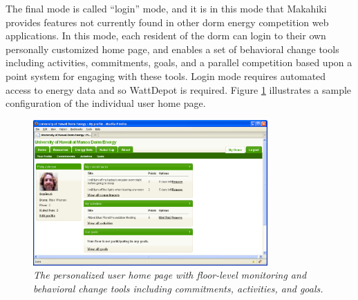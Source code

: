 The final mode is called ``login'' mode, and it is in this mode that
Makahiki provides features not currently found in other dorm energy
competition web applications.  In this mode, each resident of the dorm can
login to their own personally customized home page, and enables a set of
behavioral change tools including activities, commitments, goals, and a
parallel competition based upon a point system for engaging with these
tools.  Login mode requires automated access to energy data and so
WattDepot is required.  Figure \ref{fig:makahiki-login} illustrates a sample
configuration of the individual user home page. 

\begin{figure}[!th]
  \center
  \includegraphics[width=0.8\textwidth]{makahiki.login.eps}
  \caption{\em \small The personalized user home page with floor-level monitoring and behavioral change tools 
including commitments, activities, and goals.}
  \label{fig:makahiki-login}
\end{figure} 




















